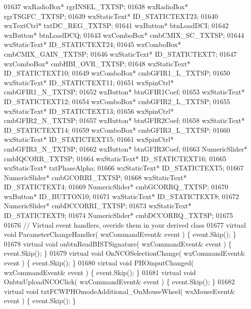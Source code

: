 \begin{DoxyCode}
01637         wxRadioBox* rgrINSEL_TXTSP;
01638         wxRadioBox* rgrTSGFC_TXTSP;
01639         wxStaticText* ID_STATICTEXT23;
01640         wxTextCtrl* txtDC_REG_TXTSP;
01641         wxButton* btnLoadDCI;
01642         wxButton* btnLoadDCQ;
01643         wxComboBox* cmbCMIX_SC_TXTSP;
01644         wxStaticText* ID_STATICTEXT24;
01645         wxComboBox* cmbCMIX_GAIN_TXTSP;
01646         wxStaticText* ID_STATICTEXT7;
01647         wxComboBox* cmbHBI_OVR_TXTSP;
01648         wxStaticText* ID_STATICTEXT10;
01649         wxComboBox* cmbGFIR1_L_TXTSP;
01650         wxStaticText* ID_STATICTEXT11;
01651         wxSpinCtrl* cmbGFIR1_N_TXTSP;
01652         wxButton* btnGFIR1Coef;
01653         wxStaticText* ID_STATICTEXT12;
01654         wxComboBox* cmbGFIR2_L_TXTSP;
01655         wxStaticText* ID_STATICTEXT13;
01656         wxSpinCtrl* cmbGFIR2_N_TXTSP;
01657         wxButton* btnGFIR2Coef;
01658         wxStaticText* ID_STATICTEXT14;
01659         wxComboBox* cmbGFIR3_L_TXTSP;
01660         wxStaticText* ID_STATICTEXT15;
01661         wxSpinCtrl* cmbGFIR3_N_TXTSP;
01662         wxButton* btnGFIR3Coef;
01663         NumericSlider* cmbIQCORR_TXTSP;
01664         wxStaticText* ID_STATICTEXT16;
01665         wxStaticText* txtPhaseAlpha;
01666         wxStaticText* ID_STATICTEXT5;
01667         NumericSlider* cmbGCORRI_TXTSP;
01668         wxStaticText* ID_STATICTEXT4;
01669         NumericSlider* cmbGCORRQ_TXTSP;
01670         wxButton* ID_BUTTON10;
01671         wxStaticText* ID_STATICTEXT8;
01672         NumericSlider* cmbDCCORRI_TXTSP;
01673         wxStaticText* ID_STATICTEXT9;
01674         NumericSlider* cmbDCCORRQ_TXTSP;
01675         
01676         \textcolor{comment}{// Virtual event handlers, overide them in your derived class}
01677         \textcolor{keyword}{virtual} \textcolor{keywordtype}{void} ParameterChangeHandler( wxCommandEvent& event ) \{ \textcolor{keyword}{event}.Skip(); \}
01678         \textcolor{keyword}{virtual} \textcolor{keywordtype}{void} onbtnReadBISTSignature( wxCommandEvent& event ) \{ \textcolor{keyword}{event}.Skip(); \}
01679         \textcolor{keyword}{virtual} \textcolor{keywordtype}{void} OnNCOSelectionChange( wxCommandEvent& event ) \{ \textcolor{keyword}{event}.Skip(); \}
01680         \textcolor{keyword}{virtual} \textcolor{keywordtype}{void} PHOinputChanged( wxCommandEvent& event ) \{ \textcolor{keyword}{event}.Skip(); \}
01681         \textcolor{keyword}{virtual} \textcolor{keywordtype}{void} OnbtnUploadNCOClick( wxCommandEvent& event ) \{ \textcolor{keyword}{event}.Skip(); \}
01682         \textcolor{keyword}{virtual} \textcolor{keywordtype}{void} txtFCWPHOmodeAdditional_OnMouseWheel( wxMouseEvent& event ) \{ \textcolor{keyword}{event}.Skip(); \}

\end{DoxyCode}
